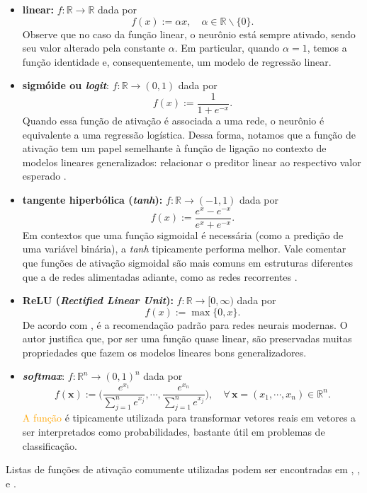 \documentclass{automatextcc}
\newcommand{\nico}[1]{\textcolor{orange}{#1}}
\newcommand{\R}{\mathds{R}}
\newcommand{\bs}[1]{\boldsymbol{#1}}
\begin{document}
\begin{itemize}
    \item \textbf{linear:} $f: \R \rightarrow \R$ dada por 
    \[f(x) := \alpha x, \quad \alpha \in \R\backslash\{0\}.\]
    Observe que no caso da função linear, o neurônio está sempre ativado, sendo seu valor alterado pela constante $\alpha$. Em particular, quando $\alpha=1$, temos a função identidade e, consequentemente, um modelo de regressão linear.
    \item \textbf{sigmóide ou \textit{logit}}: $f: \R \rightarrow (0,1)$ dada por 
    \[f(x) := \frac{1}{1 + e^{-x}}.\]
    Quando essa função de ativação é associada a uma rede, o neurônio é equivalente a uma regressão logística. Dessa forma, notamos que a função de ativação tem um papel semelhante à função de ligação no contexto de modelos lineares generalizados: relacionar o preditor linear ao respectivo valor esperado \citep{sarle1994,frei2020,mccullagh1989}.
    \item \textbf{tangente hiperbólica (\textit{tanh}):}  $f:\R \rightarrow (-1,1)$ dada por 
    \[f(x) := \frac{e^{x}-e^{-x}}{e^{x}+e^{-x}}.\]
    Em contextos que uma função sigmoidal é necessária (como a predição de uma variável binária), a \textit{tanh} tipicamente performa melhor. Vale comentar que funções de ativação sigmoidal são mais comuns em estruturas diferentes que a de redes alimentadas adiante, como as redes recorrentes \citep{goodfellow2016}.  
    \item \textbf{ReLU (\textit{Rectified Linear Unit}):} $f: \R \rightarrow [0,\infty)$ dada por 
    \[f(x) := \max\{0,x\}.\]
    De acordo com \citet{goodfellow2016}, é a recomendação padrão para redes neurais modernas. O autor justifica que, por ser uma função quase linear, são preservadas muitas propriedades que fazem os modelos lineares bons generalizadores. 
    \item \textbf{\textit{softmax}}: $f:\R^n\rightarrow (0,1)^n$ dada por 
    \[f(\bs x):=\bigg(\frac{e^{x_1}}{\sum_{j=1}^n e^{x_j}},\cdots, \frac{e^{x_n}}{\sum_{j=1}^n e^{x_j}}\bigg), \quad \forall\,\bs x=(x_1,\cdots,x_n)\in\R^n.\]
    \nico{A função} é tipicamente utilizada para transformar vetores reais em vetores a ser interpretados como probabilidades, bastante útil em problemas de classificação.
\end{itemize}

Listas de funções de ativação comumente utilizadas podem ser encontradas em \citet{hastie2009}, \citet{hagan2014}, \citet{aggarwal2018} e \citet{dsa2022}.
\end{document}
